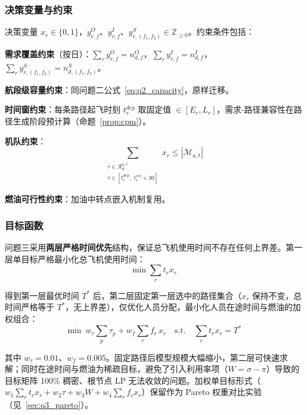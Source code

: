 \subsubsection{决策变量与约束}

决策变量 $x_r \in \{0,1\}$，$y^{O}_{r,f}$、$y^{I}_{r,f}$、$y^{S}_{r,(f_1,f_2)} \in \mathbb{Z}_{\geq 0}$。约束条件包括：

\textbf{需求覆盖约束}（按日）：$\sum_{r} y^{O}_{r,f} = n^{O}_{d,f}$，$\sum_{r} y^{I}_{r,f} = n^{I}_{d,f}$，$\sum_{r} y^{S}_{r,(f_1,f_2)} = n^{S}_{d,(f_1,f_2)}$。

\textbf{航段级容量约束}：同问题二公式~\eqref{eq:q2_capacity}，原样迁移。

\textbf{时间窗约束}：每条路径起飞时刻 $t^{dep}_r$ 取固定值 $\in [E_r, L_r]$，需求-路径兼容性在路径生成阶段预计算（命题~\ref{prop:cpm}）。

\textbf{机队约束}：
\begin{equation}
\sum_{\substack{r \in \mathcal{R}^{a,t}_d \\ \tau \in [t^{dep}_r,\; t^{ret}_r + 30]}} x_r \leq |\mathcal{M}_{a,t}|
\label{eq:q3_fleet}
\end{equation}

\textbf{燃油可行性约束}：加油中转点嵌入机制复用。

\subsubsection{目标函数}

问题三采用\textbf{两层严格时间优先}结构，保证总飞机使用时间不存在任何上界差。第一层单目标严格最小化总飞机使用时间：
\begin{equation}
\min \sum_r t_r x_r
\label{eq:q3_obj}
\end{equation}

得到第一层最优时间 $T^*$ 后，第二层固定第一层选中的路径集合（$x_r$ 保持不变，总时间严格等于 $T^*$，无上界差），仅优化人员分配，最小化人员在途时间与燃油的加权组合：
\begin{equation}
\min \ w_\tau \sum_{p} \tau_p + w_f \sum_r f_r \, x_r \quad \text{s.t.} \quad \sum_r t_r x_r = T^*
\label{eq:q3_obj2}
\end{equation}

其中 $w_\tau = 0.01$、$w_f = 0.005$。固定路径后模型规模大幅缩小，第二层可快速求解；同时在途时间与燃油为稀疏目标，避免了引入利用率项（$W = \sigma - \pi$）导致的目标矩阵 100\% 稠密、根节点 LP 无法收敛的问题。加权单目标形式（$w_1\sum_r t_r x_r + w_2\tau + w_3 W + w_4\sum_r f_r x_r$）保留作为 Pareto 权重对比实验（见~\ref{sec:q3_pareto}）。

